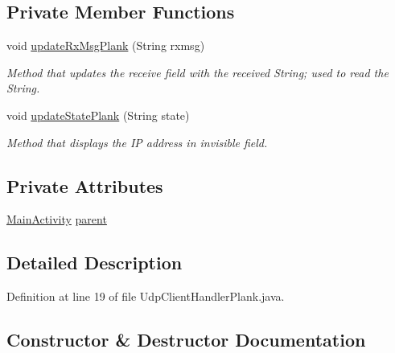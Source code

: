 \subsection*{Private Member Functions}
\begin{DoxyCompactItemize}
\item 
void \mbox{\hyperlink{classcom_1_1example_1_1trainawearapplication_1_1_udp_client_handler_plank_a83b0d0b19d7c9be902069368bd7fa84f}{update\+Rx\+Msg\+Plank}} (String rxmsg)
\begin{DoxyCompactList}\small\item\em Method that updates the receive field with the received String; used to read the String. \end{DoxyCompactList}\item 
void \mbox{\hyperlink{classcom_1_1example_1_1trainawearapplication_1_1_udp_client_handler_plank_a68ceca8349b52704db25834ca5eb5b38}{update\+State\+Plank}} (String state)
\begin{DoxyCompactList}\small\item\em Method that displays the IP address in invisible field. \end{DoxyCompactList}\end{DoxyCompactItemize}
\subsection*{Private Attributes}
\begin{DoxyCompactItemize}
\item 
\mbox{\hyperlink{classcom_1_1example_1_1trainawearapplication_1_1_main_activity}{Main\+Activity}} \mbox{\hyperlink{classcom_1_1example_1_1trainawearapplication_1_1_udp_client_handler_plank_a4ae127059889ca5270670220bb58b613}{parent}}
\end{DoxyCompactItemize}


\subsection{Detailed Description}


Definition at line 19 of file Udp\+Client\+Handler\+Plank.\+java.



\subsection{Constructor \& Destructor Documentation}
\mbox{\label{classcom_1_1example_1_1trainawearapplication_1_1_udp_client_handler_plank_a648a0fa42206709b739c8b754aa178dd}} 
